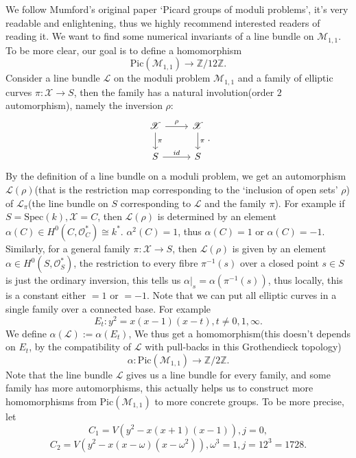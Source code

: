 \documentclass[main.tex]{subfiles}
\begin{document}
\begin{example}
We follow Mumford's original paper `Picard groups of moduli problems', it's very readable and enlightening, thus we highly recommend interested readers of reading it. We want to find some numerical invariants of a line bundle on $\mathscr{M}_{1,1}$.  To be more clear, our goal is to define a homomorphism 
$$\mathrm{Pic}(\mathscr{M}_{1,1})\rightarrow \mathbb{Z}/12\mathbb{Z}.$$
Consider a line bundle $\mathscr{L}$ on the moduli problem $\mathscr{M}_{1,1}$ and a family of elliptic curves $\pi: \mathscr{X}\rightarrow S$, then the family has a natural involution(order $2$ automorphism), namely the inversion $\rho$:
$$\begin{tikzcd}\mathscr{X}\arrow{r}{\rho}\arrow{d}{\pi} & \mathscr{X}\arrow{d}{\pi}\\
S\arrow{r}{id} & S\end{tikzcd}.$$
By the definition of a line bundle on a moduli problem, we get an automorphism $\mathscr{L}(\rho)$(that is the restriction map corresponding to the `inclusion of open sets' $\rho$) of $\mathscr{L}_{\pi}$(the line bundle on $S$ corresponding to $\mathscr{L}$ and the family $\pi$). For example if $S=\mathrm{Spec}(k), \mathscr{X}=C$, then $\mathscr{L}(\rho)$ is determined by an element $\alpha(C)\in H^{0}(C,\mathcal{O}_{C}^{*})\cong k^{*}$. $\alpha^{2}(C)=1$, thus $\alpha(C)=1$ or $\alpha(C)=-1$. Similarly, for a general family $\pi:\mathscr{X}\rightarrow S$, then $\mathscr{L}(\rho)$ is given by an element $\alpha\in H^{0}(S, \mathcal{O}_{S}^{*})$, the restriction to every fibre $\pi^{-1}(s)$ over a closed point $s\in S$ is just the ordinary inversion, this tells us $\alpha|_{s}=\alpha(\pi^{-1}(s))$, thus locally, this is a constant either $=1$ or $=-1$. Note that we can put all elliptic curves in a single family over a connected base. For example 
$$E_{t}:y^{2}=x(x-1)(x-t), t\neq 0,1, \infty.$$
We define $\alpha(\mathscr{L}):= \alpha(E_{t})$, We thus get a homomorphism(this doesn't depends on $E_{t}$, by the compatibility of $\mathscr{L}$ with pull-backs in this Grothendieck topology)
$$\alpha:\mathrm{Pic}(\mathscr{M}_{1,1})\rightarrow \mathbb{Z}/2\mathbb{Z}.$$
Note that the line bundle $\mathscr{L}$ gives us a line bundle for every family, and some family has more automorphisms, this actually helps us to construct more homomorphisms from $\mathrm{Pic}(\mathscr{M}_{1,1})$ to more concrete groups. To be more precise, let $$C_{1}=V(y^{2}-x(x+1)(x-1)), j=0,$$ 
$$C_{2}=V(y^{2}-x(x-\omega)(x-\omega^{2})),\omega^{3}=1, j=12^{3}=1728.$$ 

\end{example}
\end{document}
